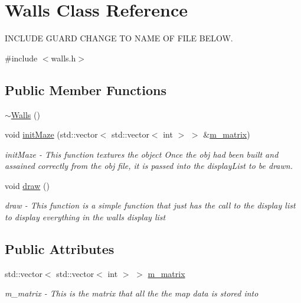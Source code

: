 \hypertarget{classWalls}{
\section{Walls Class Reference}
\label{classWalls}
}


INCLUDE GUARD CHANGE TO NAME OF FILE BELOW.  


{\ttfamily \#include $<$walls.h$>$}\subsection*{Public Member Functions}
\begin{DoxyCompactItemize}
\item 
\hyperlink{classWalls_a1136e53ddf2cc39aa354e9a02ec98f43}{$\sim$Walls} ()
\item 
void \hyperlink{classWalls_aacfe33e1ef049f1a5091fda57ebc03aa}{initMaze} (std::vector$<$ std::vector$<$ int $>$ $>$ \&\hyperlink{classWalls_aa68c3a67a13d5996ca1bdb1e7a751943}{m\_\-matrix})
\begin{DoxyCompactList}\small\item\em initMaze -\/ This function textures the object Once the obj had been built and assained correctly from the obj file, it is passed into the displayList to be drawn. \item\end{DoxyCompactList}\item 
\hypertarget{classWalls_a3edb83d6db97493d4bdfc5097509b5ba}{
void \hyperlink{classWalls_a3edb83d6db97493d4bdfc5097509b5ba}{draw} ()}
\label{classWalls_a3edb83d6db97493d4bdfc5097509b5ba}

\begin{DoxyCompactList}\small\item\em draw -\/ This function is a simple function that just has the call to the display list to display everything in the walls display list \item\end{DoxyCompactList}\end{DoxyCompactItemize}
\subsection*{Public Attributes}
\begin{DoxyCompactItemize}
\item 
\hypertarget{classWalls_aa68c3a67a13d5996ca1bdb1e7a751943}{
std::vector$<$ std::vector$<$ int $>$ $>$ \hyperlink{classWalls_aa68c3a67a13d5996ca1bdb1e7a751943}{m\_\-matrix}}
\label{classWalls_aa68c3a67a13d5996ca1bdb1e7a751943}

\begin{DoxyCompactList}\small\item\em m\_\-matrix -\/ This is the matrix that all the the map data is stored into \item\end{DoxyCompactList}\end{DoxyCompactItemize}


